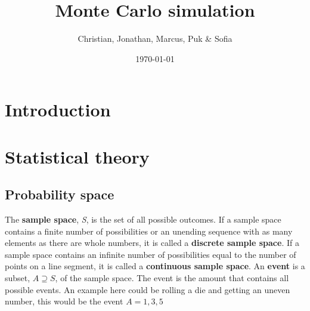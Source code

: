 \documentclass{article}
\title{Monte Carlo simulation}
\author{Christian, Jonathan, Marcus, Puk & Sofia }
\date{\today}
\begin{document}
	\maketitle
	\newpage
	\tableofcontents
	\newpage
	\section{Introduction}
	\newpage
	\section{Statistical theory}
	\subsection{Probability space}
 
	The \textbf{sample space}, \textit{S}, is the set of all possible outcomes.
	\newline
	If a sample space contains a finite number of possibilities or an unending sequence with as many elements as there are whole numbers, it is called a \textbf{discrete sample space}.
	\newline
	If a sample space contains an infinite number of possibilities equal to the number of points on a line segment, it is called a \textbf{continuous sample space}.
	\break
	\newline
	An \textbf{event} is a subset, $A\supseteq S$, of the sample space. The event is the amount that contains all possible events.
	An example here could be rolling a die and getting an uneven number, this would be the event $A={1,3,5}$
	\newline 
	
\end{document}
